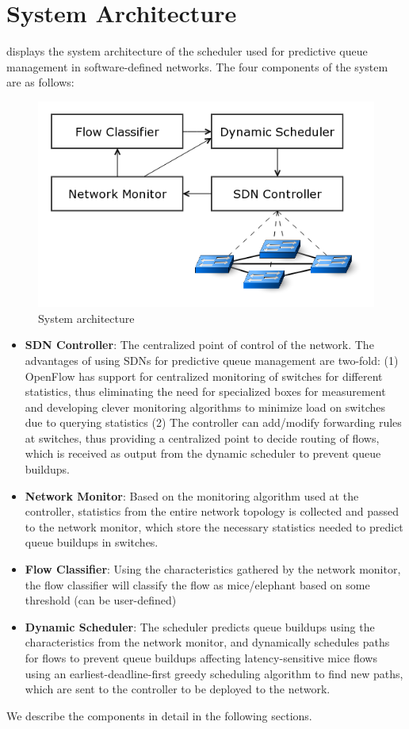 \section{System Architecture}
 displays the system architecture of the scheduler used
for predictive queue management in software-defined networks. The four 
components of the system are as follows: 
\begin{figure}
	\centering
	\includegraphics[width=\columnwidth]{architecture.png}
	\caption{System architecture}
	\label{fig:architecture}
\end{figure}

\begin{itemize}
	\item \textbf{SDN Controller}: The centralized point of control of the network. The 
	advantages of using SDNs for predictive queue management are two-fold:
	(1) OpenFlow has support for centralized monitoring of switches for different
	statistics, thus eliminating the need for specialized boxes for measurement and
	developing clever monitoring algorithms to minimize load on switches due to 
	querying statistics (2) The controller can add/modify forwarding rules at switches,
	thus providing a centralized point to decide routing of flows, which is received as
	output from the dynamic scheduler to prevent queue buildups. 
	
	\item \textbf{Network Monitor}: Based on the monitoring algorithm used at the
	controller, statistics from the entire network topology is collected and passed to the
	network monitor, which store the necessary statistics needed to predict queue buildups in switches.
	
	\item \textbf{Flow Classifier}: Using the characteristics gathered by the network monitor,
	the flow classifier will classify the flow as mice/elephant based on some threshold (can be user-defined)
	
	\item \textbf{Dynamic Scheduler}: The scheduler predicts queue buildups using the characteristics
	from the network monitor, and dynamically schedules paths for flows to prevent queue buildups affecting
	latency-sensitive mice flows using an earliest-deadline-first greedy scheduling algorithm to find new paths,
	which are sent to the controller to be deployed to the network.
\end{itemize}
We describe the components in detail in the following sections.
